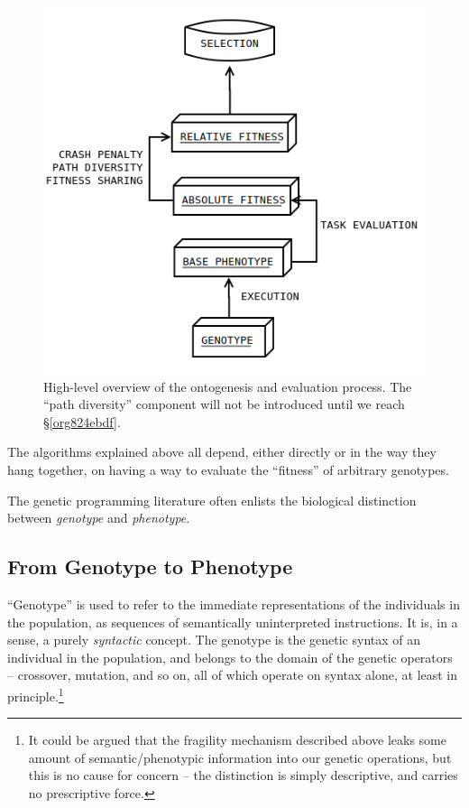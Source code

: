 \documentclass[12pt,glossary]{dalthesis}
\begin{document}
\begin{figure}[htbp]
\centering
\includegraphics[width=.9\linewidth]{../images/evaluation_model.png}
\caption{\label{fig:org5e07f8b}
High-level overview of the ontogenesis and evaluation process. The ``path diversity'' component will not be introduced until we reach \S \ref{org824ebdf}.}
\end{figure}

The algorithms explained above all depend, either directly or in the way they
hang together, on having a way to evaluate the ``fitness'' of arbitrary genotypes.

The genetic programming literature often enlists the biological distinction
between \emph{genotype} and \emph{phenotype}.

\subsection{From Genotype to Phenotype}
\label{sec:orgf371f5f}
\label{org449ae92}

``Genotype'' is used to refer to the immediate representations of the individuals
in the population, as sequences of semantically uninterpreted instructions. It
is, in a sense, a purely \emph{syntactic} concept. The genotype is the genetic syntax
of an individual in the population, and belongs to the domain of the genetic
operators -- crossover, mutation, and so on, all of which operate on syntax alone,
at least in principle.\footnote{It could be argued that the fragility mechanism described above leaks some
  amount of semantic/phenotypic information into our genetic operations, but
  this is no cause for concern -- the distinction is simply descriptive, and
  carries no prescriptive force.}
\end{document}
